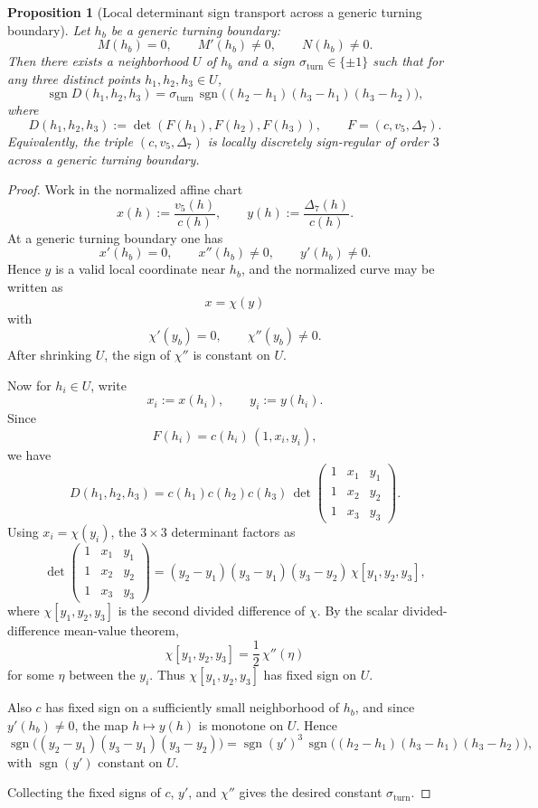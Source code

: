 \documentclass[11pt,a4paper]{amsart}
\theoremstyle{plain}
\newtheorem{proposition}[theorem]{Proposition}
\theoremstyle{definition}
\begin{document}
\begin{proposition}[Local determinant sign transport across a generic turning boundary]
\label{prop:local-determinant-sign-transport-turning}
Let $h_b$ be a generic turning boundary:
\[
M(h_b)=0,\qquad M'(h_b)\neq 0,\qquad N(h_b)\neq 0.
\]
Then there exists a neighborhood $U$ of $h_b$ and a sign
$\sigma_{\mathrm{turn}}\in\{\pm 1\}$ such that for any three distinct points
$h_1,h_2,h_3\in U$,
\[
\operatorname{sgn} D(h_1,h_2,h_3)
=
\sigma_{\mathrm{turn}}\,
\operatorname{sgn}\bigl((h_2-h_1)(h_3-h_1)(h_3-h_2)\bigr),
\]
where
\[
D(h_1,h_2,h_3):=\det(F(h_1),F(h_2),F(h_3)),
\qquad
F=(c,v_5,\Delta_7).
\]
Equivalently, the triple $(c,v_5,\Delta_7)$ is locally discretely sign-regular
of order $3$ across a generic turning boundary.
\end{proposition}

\begin{proof}
Work in the normalized affine chart
\[
x(h):=\frac{v_5(h)}{c(h)},
\qquad
y(h):=\frac{\Delta_7(h)}{c(h)}.
\]
At a generic turning boundary one has
\[
x'(h_b)=0,\qquad x''(h_b)\neq 0,\qquad y'(h_b)\neq 0.
\]
Hence $y$ is a valid local coordinate near $h_b$, and the normalized curve
may be written as
\[
x=\chi(y)
\]
with
\[
\chi'(y_b)=0,\qquad \chi''(y_b)\neq 0.
\]
After shrinking $U$, the sign of $\chi''$ is constant on $U$.

Now for $h_i\in U$, write
\[
x_i:=x(h_i),\qquad y_i:=y(h_i).
\]
Since
\[
F(h_i)=c(h_i)\,(1,x_i,y_i),
\]
we have
\[
D(h_1,h_2,h_3)
=
c(h_1)c(h_2)c(h_3)\,
\det\!\begin{pmatrix}
1&x_1&y_1\\
1&x_2&y_2\\
1&x_3&y_3
\end{pmatrix}.
\]
Using $x_i=\chi(y_i)$, the $3\times 3$ determinant factors as
\[
\det\!\begin{pmatrix}
1&x_1&y_1\\
1&x_2&y_2\\
1&x_3&y_3
\end{pmatrix}
=
(y_2-y_1)(y_3-y_1)(y_3-y_2)\,\chi[y_1,y_2,y_3],
\]
where $\chi[y_1,y_2,y_3]$ is the second divided difference of $\chi$.
By the scalar divided-difference mean-value theorem,
\[
\chi[y_1,y_2,y_3]=\frac12\,\chi''(\eta)
\]
for some $\eta$ between the $y_i$. Thus $\chi[y_1,y_2,y_3]$ has fixed sign
on $U$.

Also $c$ has fixed sign on a sufficiently small neighborhood of $h_b$, and
since $y'(h_b)\neq 0$, the map $h\mapsto y(h)$ is monotone on $U$. Hence
\[
\operatorname{sgn}\bigl((y_2-y_1)(y_3-y_1)(y_3-y_2)\bigr)
=
\operatorname{sgn}(y')^3\,
\operatorname{sgn}\bigl((h_2-h_1)(h_3-h_1)(h_3-h_2)\bigr),
\]
with $\operatorname{sgn}(y')$ constant on $U$.

Collecting the fixed signs of $c$, $y'$, and $\chi''$ gives the desired
constant $\sigma_{\mathrm{turn}}$.
\end{proof}
\end{document}
